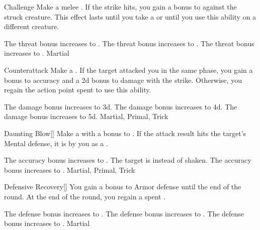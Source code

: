 \lowercase{\hypertarget{maneuver:Challenge}{}}\label{maneuver:Challenge}
\begin{freeability}{\hypertarget{maneuver:Challenge}{Challenge}}
Make a melee .
If the strike hits, you gain a  bonus to  against the struck creature.
This effect lasts until you take a  or until you use this ability on a different creature.

\rankline
{} The threat bonus increases to .
 The threat bonus increases to .
 The threat bonus increases to .
 Martial
\end{freeability}
\vspace{0.25em}



\lowercase{\hypertarget{maneuver:Counterattack}{}}\label{maneuver:Counterattack}
\begin{apability}{\hypertarget{maneuver:Counterattack}{Counterattack}}
Make a .
If the target attacked you in the same phase, you gain a  bonus to accuracy and a \plus2d bonus to damage with the strike.
Otherwise, you regain the action point spent to use this ability.

\rankline
{} The damage bonus increases to \plus3d.
 The damage bonus increases to \plus4d.
 The damage bonus increases to \plus5d.
 Martial, Primal, Trick
\end{apability}
\vspace{0.25em}



\lowercase{\hypertarget{maneuver:Daunting Blow}{}}\label{maneuver:Daunting Blow}
\begin{apability}{\hypertarget{maneuver:Daunting Blow}{Daunting Blow}}[]
Make a  with a  bonus to .
If the attack result hits the target's Mental defense,
it is  by you as a .

\rankline
{} The accuracy bonus increases to .
 The target is  instead of shaken.
 The accuracy bonus increases to .
 Martial, Primal, Trick
\end{apability}
\vspace{0.25em}



\lowercase{\hypertarget{maneuver:Defensive Recovery}{}}\label{maneuver:Defensive Recovery}
\begin{freeability}{\hypertarget{maneuver:Defensive Recovery}{Defensive Recovery}}[]
You gain a  bonus to Armor defense until the end of the round.
At the end of the round, you regain a spent .

\rankline
{} The defense bonus increases to .
 The defense bonus increases to .
 The defense bonus increases to .
 Martial
\end{freeability}
\vspace{0.25em}



